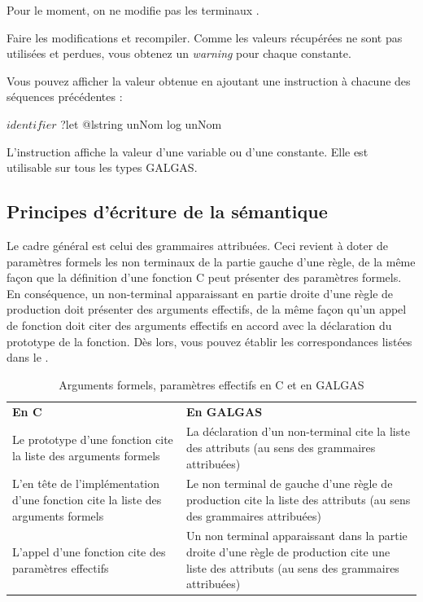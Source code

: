Pour le moment, on ne modifie pas les terminaux .

Faire les modifications et recompiler. Comme les valeurs récupérées ne sont pas utilisées et perdues, vous obtenez un \emph{warning} pour chaque constante.

Vous pouvez afficher la valeur obtenue en ajoutant une instruction  à chacune des séquences précédentes :
\begin{galgascode}
$identifier$ ?let @lstring unNom
log unNom
\end{galgascode}

L'instruction  affiche la valeur d'une variable ou d’une constante. Elle est utilisable sur tous les types GALGAS.

\subsection{Principes d'écriture de la sémantique}

Le cadre général est celui des grammaires attribuées. Ceci revient à doter de paramètres formels les non terminaux de la partie gauche d'une règle, de la même façon que la définition d'une fonction C peut présenter des paramètres formels. En conséquence, un non-terminal apparaissant en partie droite d'une règle de production doit présenter des arguments effectifs, de la même façon qu'un appel de fonction doit citer des arguments effectifs en accord avec la déclaration du prototype de la fonction. Dès lors, vous pouvez établir les correspondances listées dans le .

\begin{table}[t]
  \centering
  \begin{tabular}{p{8cm}p{6.7cm}}
    \textbf{En C} & \textbf{En GALGAS} \\
     Le prototype d'une fonction cite la liste des arguments formels & La déclaration d'un non-terminal cite la liste des attributs (au sens des grammaires attribuées) \\
     L'en tête de l'implémentation d'une fonction cite la liste des arguments formels & Le non terminal de gauche d'une règle de production cite la liste des attributs (au sens des grammaires attribuées) \\
     L'appel d'une fonction cite des paramètres effectifs & Un non terminal apparaissant dans la partie droite d'une règle de production cite une liste des attributs (au sens des grammaires attribuées) \\
  \end{tabular}
  \caption{Arguments formels, paramètres effectifs en C et en GALGAS}
  \ligne
\end{table}


